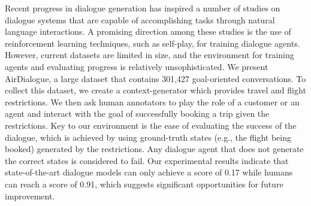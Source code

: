 Recent progress in dialogue generation has inspired a number of studies on dialogue systems that are capable of accomplishing tasks through natural language interactions. A promising direction among these studies is the use of reinforcement learning techniques, such as self-play, for training dialogue agents. However, current datasets are limited in size, and the environment for training agents and evaluating progress is relatively unsophisticated. We present AirDialogue, a large dataset that contains 301,427 goal-oriented conversations. To collect this dataset, we create a context-generator which provides travel and flight restrictions. We then ask human annotators to play the role of a customer or an agent and interact with the goal of successfully booking a trip given the restrictions. Key to our environment is the ease of evaluating the success of the dialogue, which is achieved by using ground-truth states (e.g., the flight being booked) generated by the restrictions. Any dialogue agent that does not generate the correct states is considered to fail. Our experimental results indicate that state-of-the-art dialogue models can only achieve a score of 0.17 while humans can reach a score of 0.91, which suggests significant opportunities for future improvement.
